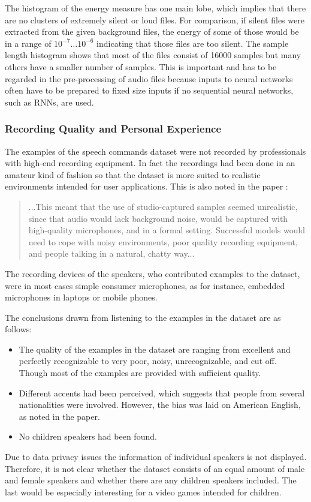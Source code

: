 \FloatBarrier
\noindent
The histogram of the energy measure has one main lobe, which implies that there are no clusters of extremely silent or loud files.
For comparison, if silent files were extracted from the given background files, the energy of some of those would be in a range of $10^{-7} \dots 10^{-6}$ indicating that those files are too silent.
The sample length histogram shows that most of the files consist of 16000 samples but many others have a smaller number of samples. 
This is important and has to be regarded in the pre-processing of audio files because inputs to neural networks often have to be prepared to fixed size inputs if no sequential neural networks, such as RNNs, are used.



\subsubsection{Recording Quality and Personal Experience}
The examples of the speech commands dataset \cite{Warden2018} were not recorded by professionals with high-end recording equipment.
In fact the recordings had been done in an amateur kind of fashion so that the dataset is more suited to realistic environments intended for user applications.
This is also noted in the paper \cite{Warden2018}:
\begin{quote}
...This meant that the use of studio-captured samples seemed unrealistic, since that audio would lack background noise, would be captured with high-quality microphones, and in a formal setting. 
Successful models would need to cope with noisy environments, poor quality recording equipment, and people talking in a natural, chatty way...
\end{quote}
The recording devices of the speakers, who contributed examples to the dataset, were in most cases simple consumer microphones, as for instance, embedded microphones in laptops or mobile phones.

The conclusions drawn from listening to the examples in the dataset are as follows:
\begin{itemize}
  \item The quality of the examples in the dataset are ranging from excellent and perfectly recognizable to very poor, noisy, unrecognizable, and cut off. Though most of the examples are provided with sufficient quality.
  \item Different accents had been perceived, which suggests that people from several nationalities were involved.
  However, the bias was laid on American English, as noted in the paper.
  \item No children speakers had been found.
\end{itemize}
Due to data privacy issues the information of individual speakers is not displayed.
Therefore, it is not clear whether the dataset consists of an equal amount of male and female speakers and whether there are any children speakers included.
The last would be especially interesting for a video games intended for children.

